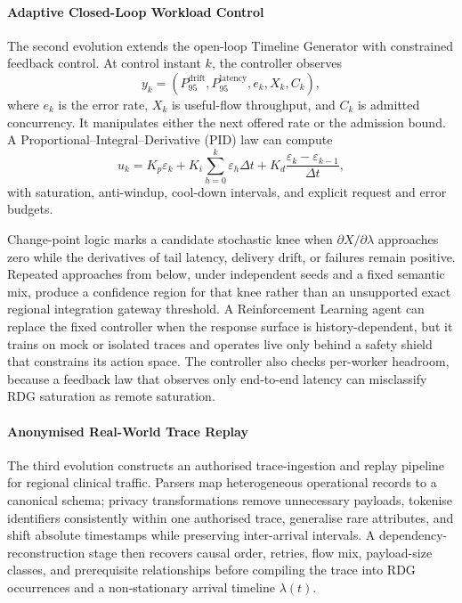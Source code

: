 \paragraph{Adaptive Closed-Loop Workload Control}
\noindent The second evolution extends the open-loop Timeline Generator with
constrained feedback control. At control instant $k$, the controller observes
\[
 y_k=\left(P_{95}^{\mathrm{drift}},P_{95}^{\mathrm{latency}},
 e_k,X_k,C_k\right),
\]
where $e_k$ is the error rate, $X_k$ is useful-flow throughput, and $C_k$ is
admitted concurrency. It manipulates either the next offered rate or the
admission bound. A Proportional--Integral--Derivative (PID) law can compute
\begin{equation}
    u_k=K_p\varepsilon_k
        +K_i\sum_{h=0}^{k}\varepsilon_h\Delta t
        +K_d\frac{\varepsilon_k-\varepsilon_{k-1}}{\Delta t},
\end{equation}
with saturation, anti-windup, cool-down intervals, and explicit request and
error budgets.

\noindent Change-point logic marks a candidate stochastic knee when
$\partial X/\partial\lambda$ approaches zero while the derivatives of tail
latency, delivery drift, or failures remain positive. Repeated approaches from
below, under independent seeds and a fixed semantic mix, produce a confidence
region for that knee rather than an unsupported exact regional integration gateway threshold. A
Reinforcement Learning agent can replace the fixed controller when the response
surface is history-dependent, but it trains on mock or isolated traces and
operates live only behind a safety shield that constrains its action space. The
controller also checks per-worker headroom, because a feedback law that observes
only end-to-end latency can misclassify RDG saturation as remote
saturation.

\paragraph{Anonymised Real-World Trace Replay}
\noindent The third evolution constructs an authorised trace-ingestion and replay
pipeline for regional clinical traffic. Parsers map heterogeneous operational
records to a canonical schema; privacy transformations remove unnecessary
payloads, tokenise identifiers consistently within one authorised trace,
generalise rare attributes, and shift absolute timestamps while preserving
inter-arrival intervals. A dependency-reconstruction stage then recovers causal
order, retries, flow mix, payload-size classes, and prerequisite relationships
before compiling the trace into RDG occurrences and a non-stationary arrival
timeline $\lambda(t)$.

